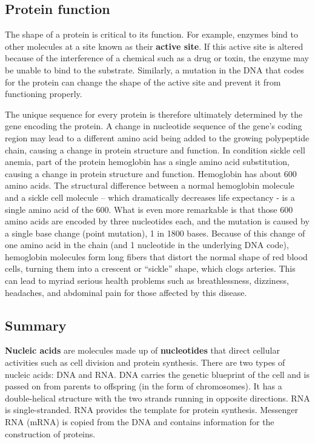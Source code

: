 \documentclass[
]{book}
\begin{document}
\hypertarget{protein-function}{%
\subsection{Protein function}\label{protein-function}}

The shape of a protein is critical to its function. For example, enzymes
bind to other molecules at a site known as their \textbf{active site}. If
this active site is altered because of the interference of a chemical
such as a drug or toxin, the enzyme may be unable to bind to the
substrate. Similarly, a mutation in the DNA that codes for the protein
can change the shape of the active site and prevent it from functioning
properly.

The unique sequence for every protein is therefore ultimately determined
by the gene encoding the protein. A change in nucleotide sequence of the
gene's coding region may lead to a different amino acid being added to
the growing polypeptide chain, causing a change in protein structure and
function. In condition sickle cell anemia, part of the protein
hemoglobin has a single amino acid substitution, causing a change in
protein structure and function. Hemoglobin has about 600 amino acids.
The structural difference between a normal hemoglobin molecule and a
sickle cell molecule -- which dramatically decreases life expectancy -
is a single amino acid of the 600. What is even more remarkable is that
those 600 amino acids are encoded by three nucleotides each, and the
mutation is caused by a single base change (point mutation), 1 in 1800
bases. Because of this change of one amino acid in the chain (and 1
nucleotide in the underlying DNA code), hemoglobin molecules form long
fibers that distort the normal shape of red blood cells, turning them
into a crescent or ``sickle'' shape, which clogs arteries. This can lead
to myriad serious health problems such as breathlessness, dizziness,
headaches, and abdominal pain for those affected by this disease.

\hypertarget{summary}{%
\subsection{Summary}\label{summary}}

\textbf{Nucleic acids} are molecules made up of \textbf{nucleotides} that direct
cellular activities such as cell division and protein synthesis. There
are two types of nucleic acids: DNA and RNA. DNA carries the genetic
blueprint of the cell and is passed on from parents to offspring (in the
form of chromosomes). It has a double-helical structure with the two
strands running in opposite directions. RNA is single-stranded. RNA
provides the template for protein synthesis. Messenger RNA (mRNA) is
copied from the DNA and contains information for the construction of
proteins.
\end{document}
